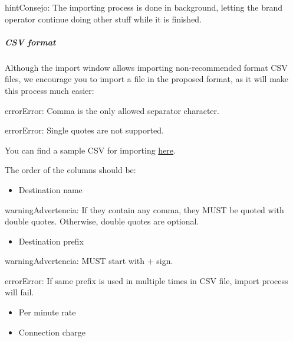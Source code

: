 \documentclass[letterpaper,10pt,spanish]{sphinxmanual}
\begin{document}
\begin{notice}{hint}{Consejo:}
The importing process is done in background, letting the brand operator
continue doing other stuff while it is finished.
\end{notice}


\subparagraph{CSV format}
\label{administration_portal/brand/billing/destination_rates:csv-format}
Although the import window allows importing non-recommended format CSV files,
we encourage you to import a file in the proposed format, as it will make
this process much easier:

\begin{notice}{error}{Error:}
Comma is the only allowed separator character.
\end{notice}

\begin{notice}{error}{Error:}
Single quotes are not supported.
\end{notice}

You can find a sample CSV for importing \href{https://raw.githubusercontent.com/irontec/ivozprovider/bleeding/web/portal/brand/samples/billing/pricesSample.csv}{here}.

The order of the columns should be:
\begin{itemize}
\item {} 
Destination name

\end{itemize}

\begin{notice}{warning}{Advertencia:}
If they contain any comma, they MUST be quoted with double quotes. Otherwise, double quotes are optional.
\end{notice}
\begin{itemize}
\item {} 
Destination prefix

\end{itemize}

\begin{notice}{warning}{Advertencia:}
MUST start with + sign.
\end{notice}

\begin{notice}{error}{Error:}
If same prefix is used in multiple times in CSV file, import process will fail.
\end{notice}
\begin{itemize}
\item {} 
Per minute rate

\item {} 
Connection charge

\end{itemize}
\end{document}
